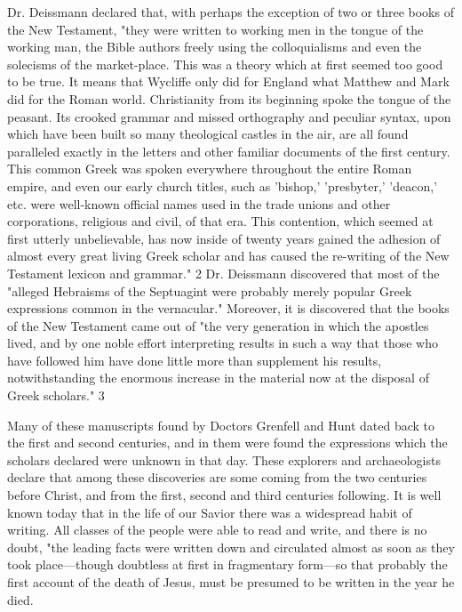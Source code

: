 Dr. Deissmann declared that, with perhaps the exception of two or three books of the New
Testament, "they were written to working men in the tongue of the working man, the Bible
authors freely using the colloquialisms and even the solecisms of the market-place. This was
a theory which at first seemed too good to be true. It means that Wycliffe only did for
England what Matthew and Mark did for the Roman world. Christianity from its beginning
spoke the tongue of the peasant. Its crooked grammar and missed orthography and peculiar
syntax, upon which have been built so many theological castles in the air, are all found
paralleled exactly in the letters and other familiar documents of the first century. This
common Greek was spoken everywhere throughout the entire Roman empire, and even our
early church titles, such as 'bishop,' 'presbyter,' 'deacon,' etc. were well-known official names
used in the trade unions and other corporations, religious and civil, of that era. This
contention, which seemed at first utterly unbelievable, has now inside of twenty years gained
the adhesion of almost every great living Greek scholar and has caused the re-writing of the
New Testament lexicon and grammar." 2 Dr. Deissmann discovered that most of the "alleged
Hebraisms of the Septuagint were probably merely popular Greek expressions common in
the vernacular." Moreover, it is discovered that the books of the New Testament came out of
"the very generation in which the apostles lived, and by one noble effort interpreting results
in such a way that those who have followed him have done little more than supplement his
results, notwithstanding the enormous increase in the material now at the disposal of Greek
scholars." 3

Many of these manuscripts found by Doctors Grenfell and Hunt dated back to the first and
second centuries, and in them were found the expressions which the scholars declared were
unknown in that day. These explorers and archaeologists declare that among these
discoveries are some coming from the two centuries before Christ, and from the first, second
and third centuries following. It is well known today that in the life of our Savior there was a
widespread habit of writing. All classes of the people were able to read and write, and there
is no doubt, "the leading facts were written down and circulated almost as soon as they took
place—though doubtless at first in fragmentary form—so that probably the first account of
the death of Jesus, must be presumed to be written in the year he died.

